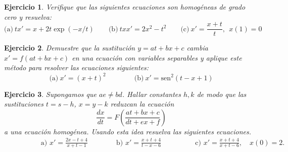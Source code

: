 \documentclass[11pt,a4paper,pdftex]{amsart}
\newtheorem{ej}{Ejercicio}%
\numberwithin{equation}{section}%
\newcommand{\bej}[1]{\begin{ej}\rm{#1}}
\newcommand{\eej}{\end{ej}\vspace{-0.2cm}}
\newcommand{\di}{\displaystyle}
\newcommand{\0}{\mathbb O}
\newcommand{\8}{\infty}
\newcommand{\sen}[1]{\mbox{sen}\;{#1}}
\begin{document}



\bigskip

\bej Verifique que las siguientes ecuaciones son homog\'eneas de
grado cero y
resuelva:
\[
\mbox{(a)}\ tx'=x+2t \exp(-x/t)\qquad \mbox{(b)}\ txx'=2x^2-t^{2}\qquad
\mbox{(c)}\ x'=\di\frac{x+t}{t},\ \ x(1)=0
\]
\eej

\bigskip

\bej Demuestre que la sustituci\'on $y=at+bx+c$ cambia
$x'=f(at+bx+c)$ en una ecuaci\'on con variables separables y
aplique este m\'etodo para resolver las ecuaciones siguientes:
$$ \mbox{(a)}\ x'=(x+t)^{2} \qquad\qquad
 \mbox{(b)}\ x'=\mbox{sen}^{2}(t-x+1) $$
\eej


\bej Supongamos que $ae \ne bd$. Hallar constantes $h, k$ de modo que las 
sustituciones $t=s-h$, $x=y -k$ reduzcan la ecuaci\'on
\[ \frac{dx}{dt}= F \left( \frac{at+bx+c}{dt+ex+f} \right) \]
a una ecuaci\'on homog\'enea. Usando esta idea resuelva las siguientes 
ecuaciones.
 \[
 \begin{aligned}&\qquad\qquad\mbox{a) } x'=\frac{2x-t+4}{x+t-1}
 \qquad \qquad\mbox{b) }x'=\frac{x+t+4}{t-x-6}
 &\qquad\qquad \mbox{c) }x'=\frac{x+t+4}{x+t-6},\quad{x(0)=2}.
 \end{aligned}
 \]
\eej

\bigskip


\end{document}
